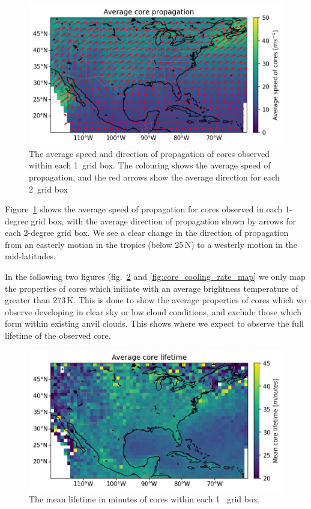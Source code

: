 \begin{figure}[tp]
    \centering
    \includegraphics[width=\textwidth]{figures/ch2_06.png}
    \caption[
    The average speed and direction of propagation of cores
    ]{
    The average speed and direction of propagation of cores observed within each 1\textdegree\ grid box. The colouring shows the average speed of propagation, and the red arrows show the average direction for each 2\textdegree\ grid box}
    \label{fig:core_propagation_map}
\end{figure}

Figure~\ref{fig:core_propagation_map} shows the average speed of propagation for cores observed in each 1-degree grid box, with the average direction of propagation shown by arrows for each 2-degree grid box.
We see a clear change in the direction of propagation from an easterly motion in the tropics (below 25\,\textdegree N) to a westerly motion in the mid-latitudes.


In the following two figures (fig.~\ref{fig:core_lifetime_map} and \ref{fig:core_cooling_rate_map} we only map the properties of cores which initiate with an average brightness temperature of greater than 273\,\unit{K}.
This is done to show the average properties of cores which we observe developing in clear sky or low cloud conditions, and exclude those which form within existing anvil clouds.
This shows where we expect to observe the full lifetime of the observed core.

\begin{figure}[tp]
    \centering
    \includegraphics[width=\textwidth]{figures/ch2_07.png}
    \caption[
    The mean lifetime in minutes of cores
    ]{
    The mean lifetime in minutes of cores within each 1
    \textdegree\ grid box.
    }
    \label{fig:core_lifetime_map}
\end{figure}

